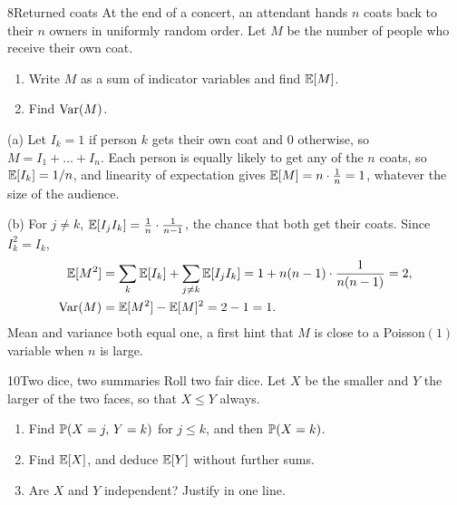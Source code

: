 \begin{problem}{8}{Returned coats}
At the end of a concert, an attendant hands $n$ coats back to their $n$ owners
in uniformly random order. Let $M$ be the number of people who receive their
own coat.
\begin{enumerate}
  \item Write $M$ as a sum of indicator variables and find $\mathbb{E}[M]$.
  \item Find $\operatorname{Var}(M)$.
\end{enumerate}
\end{problem}

\begin{solution}
(a) Let $I_k = 1$ if person $k$ gets their own coat and $0$ otherwise, so
$M = I_1+\dots+I_n$. Each person is equally likely to get any of the $n$ coats,
so $\mathbb{E}[I_k] = 1/n$, and linearity of expectation gives
$\mathbb{E}[M] = n\cdot\tfrac1n = 1$, whatever the size of the audience.

(b) For $j\ne k$, $\mathbb{E}[I_jI_k] = \frac{1}{n}\cdot\frac{1}{n-1}$, the chance
that both get their coats. Since $I_k^2 = I_k$,
\begin{align*}
  \mathbb{E}[M^2] &= \sum_k \mathbb{E}[I_k] + \sum_{j\ne k}\mathbb{E}[I_jI_k]
           = 1 + n(n-1)\cdot\frac{1}{n(n-1)} = 2, \\
  \operatorname{Var}(M) &= \mathbb{E}[M^2] - \mathbb{E}[M]^2 = 2 - 1 = 1.
\end{align*}
Mean and variance both equal one, a first hint that $M$ is close to a
Poisson$(1)$ variable when $n$ is large.
\end{solution}

\begin{problem}{10}{Two dice, two summaries}
Roll two fair dice. Let $X$ be the smaller and $Y$ the larger of the two
faces, so that $X \le Y$ always.
\begin{enumerate}
  \item Find $\mathbb{P}(X = j,\,Y = k)$ for $j \le k$, and then $\mathbb{P}(X = k)$.
  \item Find $\mathbb{E}[X]$, and deduce $\mathbb{E}[Y]$ without further sums.
  \item Are $X$ and $Y$ independent? Justify in one line.
\end{enumerate}
\end{problem}

